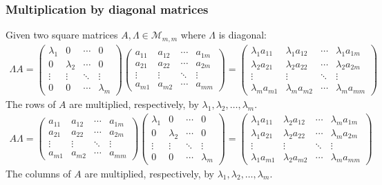 \documentclass[usenames,dvipsnames,aspectratio=169,10pt]{beamer}
\numberwithin{equation}{section}
\begin{document}
\begin{frame}
\frametitle{Multiplication by diagonal matrices}
Given two square matrices $A,\Lambda \in\mathcal{M}_{m,m}$ where $\Lambda$ is diagonal:
\begin{align*}
\Lambda A = 
\begin{pmatrix}
\lambda_1 &    0      & \cdots & 0 \\
0         & \lambda_2 & \cdots & 0 \\
\vdots    & \vdots    & \ddots & \vdots \\
0         &    0      & \cdots & \lambda_m
\end{pmatrix}
\begin{pmatrix}
a_{11} & a_{12} & \cdots & a_{1m} \\
a_{21} & a_{22} & \cdots & a_{2m} \\
\vdots & \vdots & \ddots & \vdots \\
a_{m1} & a_{m2} & \cdots & a_{mm}
\end{pmatrix}
=
\begin{pmatrix}
\lambda_1 a_{11} & \lambda_1 a_{12} & \cdots & \lambda_1 a_{1m} \\
\lambda_2 a_{21} & \lambda_2 a_{22} & \cdots & \lambda_2 a_{2m} \\
\vdots & \vdots & \ddots & \vdots \\
\lambda_m a_{m1} & \lambda_m a_{m2} & \cdots & \lambda_m a_{mm}
\end{pmatrix}
\end{align*}
The rows of $A$ are multiplied, respectively, by $\lambda_1, \lambda_2, \dots, \lambda_m$.
\begin{align*}
A \Lambda = 
\begin{pmatrix}
a_{11} & a_{12} & \cdots & a_{1m} \\
a_{21} & a_{22} & \cdots & a_{2m} \\
\vdots & \vdots & \ddots & \vdots \\
a_{m1} & a_{m2} & \cdots & a_{mm}
\end{pmatrix}
\begin{pmatrix}
\lambda_1 &    0      & \cdots & 0 \\
0         & \lambda_2 & \cdots & 0 \\
\vdots    & \vdots    & \ddots & \vdots \\
0         &    0      & \cdots & \lambda_m
\end{pmatrix}
=
\begin{pmatrix}
\lambda_1 a_{11} & \lambda_2 a_{12} & \cdots & \lambda_m a_{1m} \\
\lambda_1 a_{21} & \lambda_2 a_{22} & \cdots & \lambda_m a_{2m} \\
\vdots & \vdots & \ddots & \vdots \\
\lambda_1 a_{m1} & \lambda_2 a_{m2} & \cdots & \lambda_m a_{mm}
\end{pmatrix}
\end{align*}
The columns of $A$ are multiplied, respectively, by $\lambda_1, \lambda_2, \dots, \lambda_m$.
\end{frame}
\end{document}
